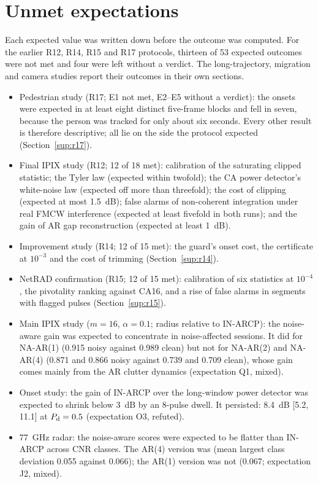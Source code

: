 \documentclass[10pt]{article}
\begin{document}
\section{Unmet expectations}\label{sup:unmet}
Each expected value was written down before the outcome was computed. For the earlier R12, R14, R15 and R17 protocols, thirteen of 53 expected outcomes were not met and four were left without a verdict. The long-trajectory, migration and camera studies report their outcomes in their own sections.
\begin{itemize}
\item Pedestrian study (R17; E1 not met, E2--E5 without a verdict): the onsets were expected in at least eight distinct five-frame blocks and fell in seven, because the person was tracked for only about six seconds. Every other result is therefore descriptive; all lie on the side the protocol expected (Section~\ref{sup:r17}).
\item Final IPIX study (R12; 12 of 18 met): calibration of the saturating clipped statistic; the Tyler law (expected within twofold); the CA power detector's white-noise law (expected off more than threefold); the cost of clipping (expected at most 1.5~dB); false alarms of non-coherent integration under real FMCW interference (expected at least fivefold in both runs); and the gain of AR gap reconstruction (expected at least 1~dB).
\item Improvement study (R14; 12 of 15 met): the guard's onset cost, the certificate at $10^{-3}$ and the cost of trimming (Section~\ref{sup:r14}).
\item NetRAD confirmation (R15; 12 of 15 met): calibration of six statistics at $10^{-4}$, the pivotality ranking against CA16, and a rise of false alarms in segments with flagged pulses (Section~\ref{sup:r15}).
\item Main IPIX study ($m=16$, $\alpha=0.1$; radius relative to IN-ARCP): the noise-aware gain was expected to concentrate in noise-affected sessions. It did for NA-AR(1) (0.915 noisy against 0.989 clean) but not for NA-AR(2) and NA-AR(4) (0.871 and 0.866 noisy against 0.739 and 0.709 clean), whose gain comes mainly from the AR clutter dynamics (expectation Q1, mixed).
\item Onset study: the gain of IN-ARCP over the long-window power detector was expected to shrink below 3~dB by an 8-pulse dwell. It persisted: 8.4~dB [5.2, 11.1] at $P_{\rm d}=0.5$ (expectation O3, refuted).
\item 77~GHz radar: the noise-aware scores were expected to be flatter than IN-ARCP across CNR classes. The AR(4) version was (mean largest class deviation 0.055 against 0.066); the AR(1) version was not (0.067; expectation J2, mixed).

\end{itemize}
\end{document}

